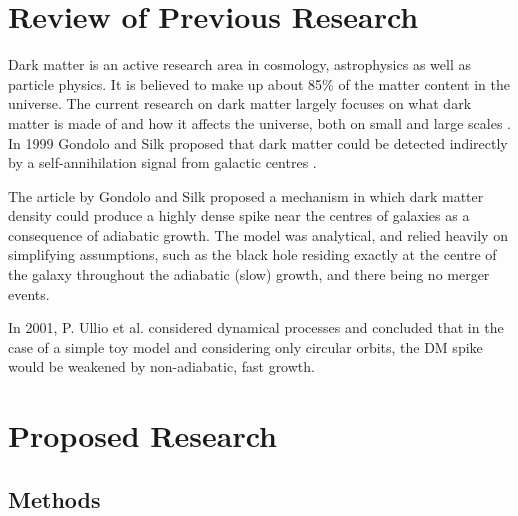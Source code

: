 \documentclass[a4paper,10pt]{article}
\begin{document}
\section{Review of Previous Research}

Dark matter is an active research area in cosmology, astrophysics as well as particle physics. It is believed to make up about 85\% of the matter content in the universe. The current research on dark matter largely focuses on what dark matter is made of and how it affects the universe, both on small and large scales \citep{this_probably_doesnt_need_a_citation}. In 1999 Gondolo and Silk proposed that dark matter could be detected indirectly by a self-annihilation signal from galactic centres \citep{GS_1999_original}. %

The article by Gondolo and Silk proposed a mechanism in which dark matter density could produce a highly dense spike near the centres of galaxies as a consequence of adiabatic growth. The model was analytical, and relied heavily on simplifying assumptions, such as the black hole residing exactly at the centre of the galaxy throughout the adiabatic (slow) growth, and there being no merger events. %

In 2001, P. Ullio et al. considered dynamical processes and concluded that in the case of a simple toy model and considering 
only circular orbits, the DM spike would be weakened by non-adiabatic, fast growth.




\section{Proposed Research}


\subsection{Methods}

\end{document}
